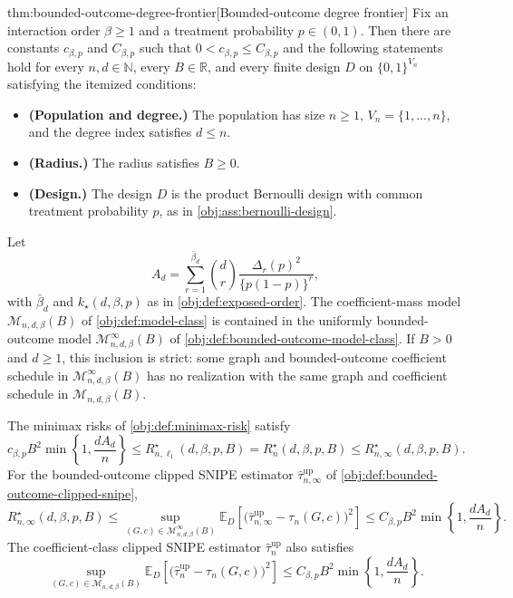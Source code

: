 \documentclass[11pt]{article}
\begin{document}
\begin{theoremv}{thm:bounded-outcome-degree-frontier}[Bounded-outcome degree frontier]
Fix an interaction order \(\beta\ge 1\) and a treatment probability \(p\in(0,1)\).  Then there are constants \(c_{\beta,p}\) and \(C_{\beta,p}\) such that \(0<c_{\beta,p}\le C_{\beta,p}\) and the following statements hold for every \(n,d\in\mathbb N\), every \(B\in\mathbb R\), and every finite design \(D\) on \(\{0,1\}^{V_n}\) satisfying the itemized conditions:
\begin{itemize}
\item \textbf{(Population and degree.)} The population has size \(n\ge1\), \(V_n=\{1,\ldots,n\}\), and the degree index satisfies \(d\le n\).
\item \textbf{(Radius.)} The radius satisfies \(B\ge0\).
\item \textbf{(Design.)} The design \(D\) is the product Bernoulli design with common treatment probability \(p\), as in \cref{obj:ass:bernoulli-design}.
\end{itemize}
Let
\[
A_d
=
\sum_{r=1}^{\bar\beta_d}
\binom{d}{r}
\frac{\Delta_r(p)^2}{\{p(1-p)\}^r},
\]
with \(\bar\beta_d\) and \(k_\star(d,\beta,p)\) as in \cref{obj:def:exposed-order}.  The coefficient-mass model \(\mathcal M_{n,d,\beta}(B)\) of \cref{obj:def:model-class} is contained in the uniformly bounded-outcome model \(\mathcal M_{n,d,\beta}^{\infty}(B)\) of \cref{obj:def:bounded-outcome-model-class}.  If \(B>0\) and \(d\ge1\), this inclusion is strict: some graph and bounded-outcome coefficient schedule in \(\mathcal M_{n,d,\beta}^{\infty}(B)\) has no realization with the same graph and coefficient schedule in \(\mathcal M_{n,d,\beta}(B)\).

The minimax risks of \cref{obj:def:minimax-risk} satisfy
\[
c_{\beta,p} B^2
\min\!\left\{1,\frac{dA_d}{n}\right\}
\le
R_{n,\ell_1}^{\star}(d,\beta,p,B)
=
R_n^{\star}(d,\beta,p,B)
\le
R_{n,\infty}^{\star}(d,\beta,p,B).
\]
For the bounded-outcome clipped SNIPE estimator \(\widehat\tau_{n,\infty}^{\mathrm{up}}\) of \cref{obj:def:bounded-outcome-clipped-snipe},
\[
R_{n,\infty}^{\star}(d,\beta,p,B)
\le
\sup_{(G,c)\in\mathcal M_{n,d,\beta}^{\infty}(B)}
\mathbb E_D\!\left[
\bigl(\widehat\tau_{n,\infty}^{\mathrm{up}}-\tau_n(G,c)\bigr)^2
\right]
\le
C_{\beta,p} B^2
\min\!\left\{1,\frac{dA_d}{n}\right\}.
\]
The coefficient-class clipped SNIPE estimator \(\widehat\tau_n^{\mathrm{up}}\) also satisfies
\[
\sup_{(G,c)\in\mathcal M_{n,d,\beta}(B)}
\mathbb E_D\!\left[
\bigl(\widehat\tau_n^{\mathrm{up}}-\tau_n(G,c)\bigr)^2
\right]
\le
C_{\beta,p} B^2
\min\!\left\{1,\frac{dA_d}{n}\right\}.
\]


\end{theoremv}
\end{document}
